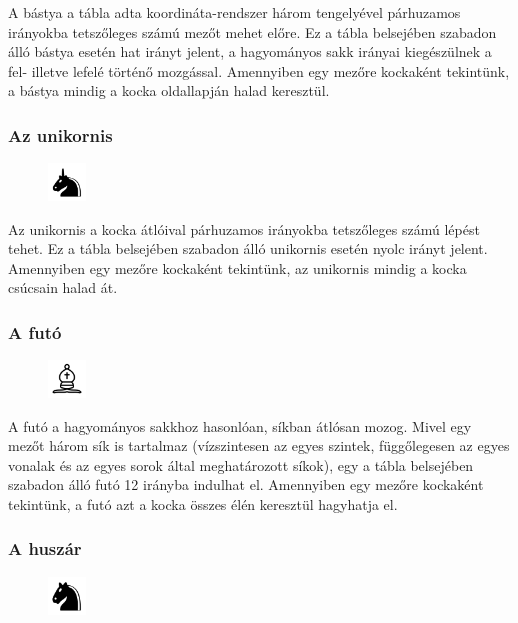 \documentclass[12pt, twoside]{report}
\begin{document}
A bástya a tábla adta koordináta-rendszer három tengelyével párhuzamos irányokba tetszőleges számú mezőt mehet előre. Ez a tábla belsejében szabadon álló bástya esetén hat irányt jelent, a hagyományos sakk irányai kiegészülnek a fel- illetve lefelé történő mozgással. Amennyiben egy mezőre kockaként tekintünk, a bástya mindig a kocka oldallapján halad keresztül.

\subsubsection{Az unikornis}

\begin{figure}
	\includegraphics[width=10mm, height=10mm]{black-unicorn}
\end{figure}

Az unikornis a kocka átlóival párhuzamos irányokba tetszőleges számú lépést tehet. Ez a tábla belsejében szabadon álló unikornis esetén nyolc irányt jelent. Amennyiben egy mezőre kockaként tekintünk, az unikornis mindig a kocka csúcsain halad át.

\subsubsection{A futó}

\begin{figure}
	\includegraphics[width=10mm, height=10mm]{white-bishop}
\end{figure}

A futó a hagyományos sakkhoz hasonlóan, síkban átlósan mozog. Mivel egy mezőt három sík is tartalmaz (vízszintesen az egyes szintek, függőlegesen az egyes vonalak és az egyes sorok által meghatározott síkok), egy a tábla belsejében szabadon álló futó 12 irányba indulhat el. Amennyiben egy mezőre kockaként tekintünk, a futó azt a kocka összes élén keresztül hagyhatja el. 

\subsubsection{A huszár}

\begin{figure}
	\includegraphics[width=10mm, height=10mm]{black-knight}
\end{figure}
\end{document}
